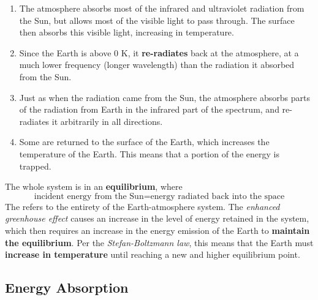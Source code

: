 \documentclass[a4paper,12pt]{article}
\begin{document}
\begin{enumerate}
  \item The atmosphere absorbs most of the infrared and ultraviolet radiation from the Sun, but allows most of the visible light to pass through. The surface then absorbs this visible light, increasing in temperature.
  \item Since the Earth is above 0 K, it \textbf{re-radiates} back at the atmosphere, at a much lower frequency (longer wavelength) than the radiation it absorbed from the Sun.
  \item Just as when the radiation came from the Sun, the atmosphere absorbs parts of the radiation from Earth in the infrared part of the spectrum, and re-radiates it arbitrarily in all directions.
  \item Some are returned to the surface of the Earth, which increases the temperature of the Earth. This means that a portion of the energy is trapped.
\end{enumerate}

The whole system is in an \textbf{equilibrium}, where
\begin{equation}\label{eq:energy-balance}
  \text{incident energy from the Sun} = \text{energy radiated back into the space}
\end{equation}
The  refers to the entirety of the Earth-atmosphere system.
The \textit{enhanced greenhouse effect} causes an increase in the level of energy retained in the system, which then requires an increase in the energy emission of the Earth to \textbf{maintain the equilibrium}. Per the \textit{Stefan-Boltzmann law}, this means that the Earth must \textbf{increase in temperature} until reaching a new and higher equilibrium point.

\subsection{Energy Absorption}
\end{document}

